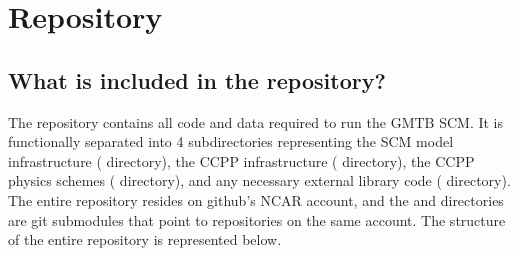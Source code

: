 \chapter{Repository}
\label{chapter: repository}
\setlength{\parskip}{12pt}



\section{What is included in the repository?}

The repository contains all code and data required to run the GMTB SCM. It is functionally separated into 4 subdirectories representing the SCM model infrastructure ( directory), the CCPP infrastructure ( directory), the CCPP physics schemes ( directory), and any necessary external library code ( directory). The entire  repository resides on github's NCAR account, and the  and  directories are git submodules that point to repositories on the same account. The structure of the entire repository is represented below.

